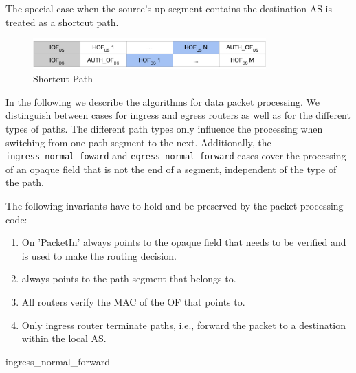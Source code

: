 The special case when the source's up-segment contains the destination AS is 
treated as a shortcut path.\newline

\begin{figure}
	\centering
	\includegraphics[width=0.8\textwidth]{figs/shortcut_path}
	\caption{Shortcut Path}
	\label{fig:shortcut_path}
\end{figure}


\noindent
In the following we describe the algorithms for data packet processing. We 
distinguish between cases for ingress and egress routers as well as for the 
different types of paths. The different path types only influence the 
processing when switching from one path segment to the next. Additionally, the 
\verb|ingress_normal_foward| and \verb|egress_normal_forward| cases cover the 
processing of an opaque field that is not the end of a segment, independent of 
the type of the path.

The following invariants have to hold and be preserved by the packet processing 
code:
\begin{enumerate}
\item On 'PacketIn' \currof always points to the opaque field that needs to be 
verified and is used to make the routing decision.
\item \curriof always points to the path segment that \currof belongs to.
\item All routers verify the MAC of the OF that \currof points to.
\item Only ingress router terminate paths, i.e., forward the packet to a 
destination within the local AS.
\end{enumerate}
\begin{algorithm}
\caption{ingress\_normal\_forward}
\begin{algorithmic}
\Else
\EndIf
{}
\EndIf
{}
\Else
\EndIf
\EndProcedure
\end{algorithmic} 
\end{algorithm}

